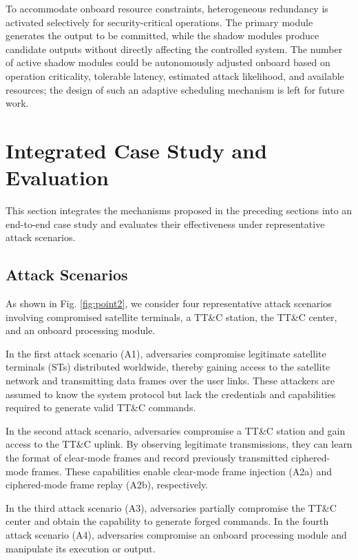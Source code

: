 \documentclass[journal]{IEEEtran}
\begin{document}
To accommodate onboard resource constraints, heterogeneous redundancy is activated selectively for security-critical operations.
The primary module generates the output to be committed, while the shadow modules produce candidate outputs without directly affecting the controlled system. 
The number of active shadow modules could be autonomously adjusted onboard based on operation criticality, tolerable latency, estimated attack likelihood, and available resources; the design of such an adaptive scheduling mechanism is left for future work. 

\section{Integrated Case Study and Evaluation}
This section integrates the mechanisms proposed in the preceding sections into an end-to-end case study and evaluates their effectiveness under representative attack scenarios.

\subsection{Attack Scenarios}
As shown in Fig. \ref{fig:point2}, we consider four representative attack scenarios involving compromised satellite terminals, a TT\&C station, the TT\&C center, and an onboard processing module.

In the first attack scenario (A1), adversaries compromise legitimate satellite terminals (STs) distributed worldwide, thereby gaining access to the satellite network and transmitting data frames over the user links. These attackers are assumed to know the system protocol but lack the credentials and capabilities required to generate valid TT\&C commands.

In the second attack scenario, adversaries compromise a TT\&C station and gain access to the TT\&C uplink. By observing legitimate transmissions, they can learn the format of clear-mode frames and record previously transmitted ciphered-mode frames. These capabilities enable clear-mode frame injection (A2a) and ciphered-mode frame replay (A2b), respectively.

In the third attack scenario (A3), adversaries partially compromise the TT\&C center and obtain the capability to generate forged commands. In the fourth attack scenario (A4), adversaries compromise an onboard processing module and manipulate its execution or output.
\end{document}
